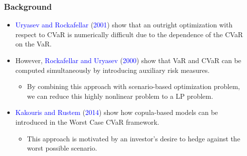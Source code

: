 \documentclass[pdf,10pt,xcolor=dvipsnames,hide notes]{beamer}
\begin{document}
\begin{frame}[label=frame1b]
	\frametitle{Background}
	
	\begin{itemize}
		\setlength{\parskip}{15pt}
		\justifying
		
	\item<1> \textcolor{blue}{Uryasev and Rockafellar} (\textcolor{blue}{2001}) show that an outright optimization with respect to CVaR is numerically difficult due to the dependence of the CVaR on the VaR. 

	\item<1> However, \textcolor{blue}{Rockafellar and Uryasev} (\textcolor{blue}{2000}) show that VaR and CVaR can be computed simultaneously by introducing auxiliary risk measures. 
	\setlength{\parskip}{0pt}
	\begin{itemize}
		\item By combining this approach with scenario-based optimization problem, we can reduce this highly nonlinear problem to a LP problem. 
	\end{itemize}
	
\setlength{\parskip}{15pt}		
	\item<2> \textcolor{blue}{Kakouris and Rustem} (\textcolor{blue}{2014}) show how copula-based models can be introduced in the Worst Case CVaR framework. 
	\setlength{\parskip}{0pt}
	\begin{itemize}
		\item This approach is motivated by an investor's desire to hedge against the worst possible scenario.
	\end{itemize}
	
    \end{itemize}

\end{frame}
\end{document}
